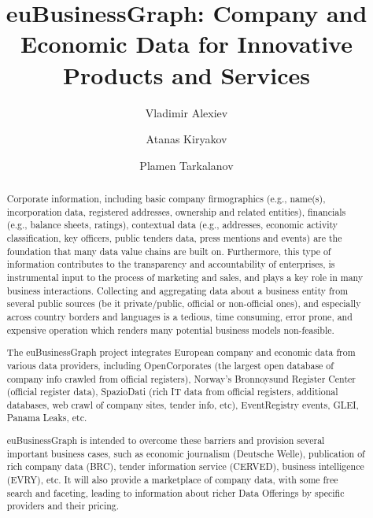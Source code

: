 \documentclass[runningheads,a4paper]{llncs}
\begin{document}
\mainmatter

\title{euBusinessGraph: Company and Economic Data for Innovative Products and Services}
\author{Vladimir Alexiev \and
Atanas Kiryakov \and
Plamen Tarkalanov}
\maketitle

\begin{abstract}
Corporate information, including basic company firmographics (e.g., name(s), incorporation data, registered addresses, ownership and related entities), financials (e.g., balance sheets, ratings), contextual data (e.g., addresses, economic activity classification, key officers, public tenders data, press mentions and events) are the foundation that many data value chains are built on. Furthermore, this type of information contributes to the transparency and accountability of enterprises, is instrumental input to the process of marketing and sales, and plays a key role in many business interactions. Collecting and aggregating data about a business entity from several public sources (be it private/public, official or non-official ones), and especially across country borders and languages is a tedious, time consuming, error prone, and expensive operation which renders many potential business models non-feasible.

The euBusinessGraph project integrates European company and economic data from various data providers, including OpenCorporates (the largest open database of company info crawled from official registers), Norway's Bronnoysund Register Center (official register data), SpazioDati (rich IT data from official registers, additional databases, web crawl of company sites, tender info, etc), EventRegistry events, GLEI, Panama Leaks, etc.

euBusinessGraph is intended to overcome these barriers and provision several important business cases, such as economic journalism (Deutsche Welle), publication of rich company data (BRC), tender information service (CERVED), business intelligence (EVRY), etc. It will also provide a marketplace of company data, with some free search and faceting, leading to information about richer Data Offerings by specific providers and their pricing.


\end{abstract}
\end{document}

